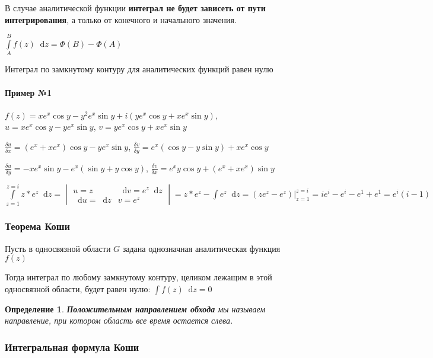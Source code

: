\documentclass{article}
\newcommand*\diff{\mathop{}\!\mathrm{d}}
\newtheorem{definition}{Определение}
\begin{document}
В случае аналитической функции \textbf{интеграл не будет зависеть от пути интегрирования}, а только от конечного и начального значения.

$\int\limits_{A}^{B} f(z) \diff z = \Phi (B) - \Phi (A)$

Интеграл по замкнутому контуру для аналитических функций равен нулю

\paragraph{Пример №1}

$f(z) = x e^{x} \cos y - y^2 e^{x} \sin y + i (y e^{x} \cos y + x e^{x} \sin y)$, $u = x e^{x} \cos y - y e^{x} \sin y$, $v = y e^{x} \cos y + x e^{x} \sin y$

$\frac{\delta u}{\delta x} = (e^{x} + x e^{x}) \cos y - y e^{x} \sin y$, $\frac{\delta v}{\delta y} = e^{x} (\cos y - y \sin y) + x e^{x} \cos y$

$\frac{\delta u}{\delta y} = - x e^{x} \sin y - e^{x} (\sin y + y \cos y)$, $\frac{\delta v}{\delta x} = e^{x} y \cos y + (e^{x} + x e^{x}) \sin y$

$\int\limits_{z = 1}^{z = i} z * e^{z} \diff z = \begin{vmatrix}
    u = z & \diff v = e^{z} \diff z \\
    \diff u = \diff z & v = e^{z}
\end{vmatrix} = z * e^{z} - \int e^{z} \diff z = (z e^{z} - e^{z}) \bigg|_{z = 1}^{z = i} = i e^{i} - e^{i} - e^{1} + e^{1} = e^{i} (i - 1)$

\subsubsection{Теорема Коши}

Пусть в односвязной области $G$ задана однозначная аналитическая функция $f(z)$

Тогда интеграл по любому замкнутому контуру, целиком лежащим в этой односвязной области, будет равен нулю: $\int f(z) \diff z = 0$

\begin{definition}
\textbf{Положительным направлением обхода} мы называем направление, при котором область все время остается слева.
\end{definition}

\subsubsection{Интегральная формула Коши}
\end{document}
